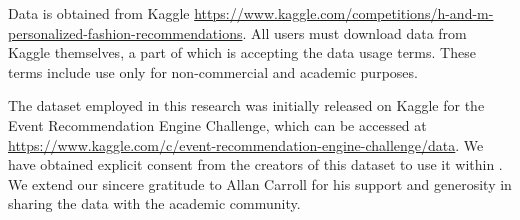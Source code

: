 \xhdr{\handm} Data is obtained from Kaggle \url{https://www.kaggle.com/competitions/h-and-m-personalized-fashion-recommendations}. All \relbench users must download data from Kaggle themselves, a part of which is accepting the data usage terms. These terms include use only for non-commercial and academic purposes.

\xhdr{\event} The dataset employed in this research was initially released on Kaggle for the Event Recommendation Engine Challenge, which can be accessed at \url{https://www.kaggle.com/c/event-recommendation-engine-challenge/data}. We have obtained explicit consent from the creators of this dataset to use it within \relbench. We extend our sincere gratitude to Allan Carroll for his support and generosity in sharing the data with the academic community.
